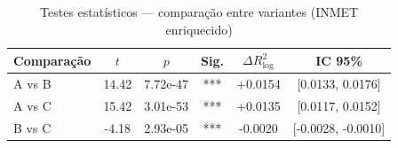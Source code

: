\begin{table}[htbp]
\centering
\caption{Testes estatísticos --- comparação entre variantes (INMET enriquecido)}
\label{tab:v4-statistical-tests}
\begin{tabular}{lccccc}
\toprule
Comparação & $t$ & $p$ & Sig. & $\Delta R^2_{\log}$ & IC 95\% \\
\midrule
    A vs B & 14.42 & 7.72e-47 & *** & +0.0154 & [0.0133, 0.0176] \\
    A vs C & 15.42 & 3.01e-53 & *** & +0.0135 & [0.0117, 0.0152] \\
    B vs C & -4.18 & 2.93e-05 & *** & -0.0020 & [-0.0028, -0.0010] \\
\bottomrule
\end{tabular}
\end{table}
